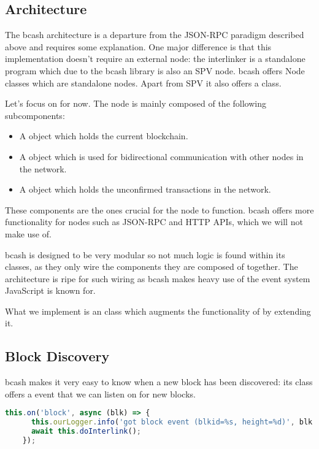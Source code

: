 \subsection{Architecture}
The bcash architecture is a departure from the JSON-RPC paradigm described above and requires some explanation. One major difference is that this implementation doesn't require an external node: the interlinker is a standalone program which due to the bcash library is also an SPV node. bcash offers Node classes which are standalone nodes. Apart from SPV it also offers a  class.

Let's focus on  for now. The node is mainly composed of the following subcomponents:

\begin{itemize}
  \item A  object which holds the current blockchain.
  \item A  object which is used for bidirectional communication with other nodes in the network.
  \item A  object which holds the unconfirmed transactions in the network.
\end{itemize}

These components are the ones crucial for the node to function. bcash offers more functionality for nodes such as JSON-RPC and HTTP APIs, which we will not make use of.

bcash is designed to be very modular so not much logic is found within its  classes, as they only wire the components they are composed of together. The architecture is ripe for such wiring as bcash makes heavy use of the event system JavaScript is known for.

What we implement is an  class which augments the functionality of  by extending it.

\subsection{Block Discovery}
bcash makes it very easy to know when a new block has been discovered: its  class offers a  event that we can listen on for new blocks.

\begin{lstlisting}[language=js]
    this.on('block', async (blk) => {
      this.ourLogger.info('got block event (blkid=%s, height=%d)', blk.rhash(), blk.height);
      await this.doInterlink();
    });
\end{lstlisting}

